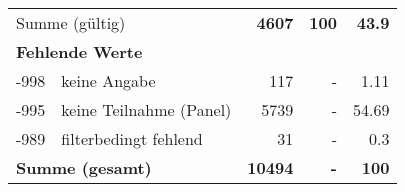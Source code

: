 \begin{longtable}{lXrrr}
     \midrule
     \multicolumn{2}{l}{Summe (gültig)} &
       \textbf{\num{4607}} &
     \textbf{100} &
       \textbf{\num[round-mode=places,round-precision=2]{43,9}} \\
     \multicolumn{5}{l}{\textbf{Fehlende Werte}}\\
       -998 &
       keine Angabe &
         \num{117} &
        - &
         \num[round-mode=places,round-precision=2]{1,11} \\
       -995 &
       keine Teilnahme (Panel) &
         \num{5739} &
        - &
         \num[round-mode=places,round-precision=2]{54,69} \\
       -989 &
       filterbedingt fehlend &
         \num{31} &
        - &
         \num[round-mode=places,round-precision=2]{0,3} \\
     \midrule
     \multicolumn{2}{l}{\textbf{Summe (gesamt)}} &
          \textbf{\num{10494}} &
        \textbf{-} &
        \textbf{100} \\
     \bottomrule
     \end{longtable}
     
